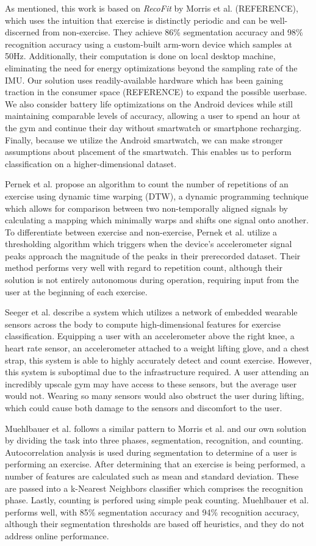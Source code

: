 As mentioned, this work is based on \textit{RecoFit} by Morris et al. (REFERENCE), which uses the intuition that exercise is distinctly periodic and can be well-discerned from non-exercise. They achieve 86\% segmentation accuracy and 98\% recognition accuracy using a custom-built arm-worn device which samples at 50Hz. Additionally, their computation is done on local desktop machine, eliminating the need for energy optimizations beyond the sampling rate of the IMU. Our solution uses readily-available hardware which has been gaining traction in the consumer space (REFERENCE) to expand the possible userbase. We also consider battery life optimizations on the Android devices while still maintaining comparable levels of accuracy, allowing a user to spend an hour at the gym and continue their day without smartwatch or smartphone recharging. Finally, because we utilize the Android smartwatch, we can make stronger assumptions about placement of the smartwatch. This enables us to perform classification on a higher-dimensional dataset.

Pernek et al. propose an algorithm to count the number of repetitions of an exercise using dynamic time warping (DTW), a dynamic programming technique which allows for comparison between two non-temporally aligned signals by calculating a mapping which minimally warps and shifts one signal onto another. To differentiate between exercise and non-exercise, Pernek et al. utilize a thresholding algorithm which triggers when the device's accelerometer signal peaks approach the magnitude of the peaks in their prerecorded dataset. Their method performs very well with regard to repetition count, although their solution is not entirely autonomous during operation, requiring input from the user at the beginning of each exercise.

Seeger et al. describe a system which utilizes a network of embedded wearable sensors across the body to compute high-dimensional features for exercise classification. Equipping a user with an accelerometer above the right knee, a heart rate sensor, an accelerometer attached to a weight lifting glove, and a chest strap, this system is able to highly accurately detect and count exercise. However, this system is suboptimal due to the infrastructure required. A user attending an incredibly upscale gym may have access to these sensors, but the average user would not. Wearing so many sensors would also obstruct the user during lifting, which could cause both damage to the sensors and discomfort to the user. 

Muehlbauer et al. follows a similar pattern to Morris et al. and our own solution by dividing the task into three phases, segmentation, recognition, and counting. Autocorrelation analysis is used during segmentation to determine of a user is performing an exercise. After determining that an exercise is being performed, a number of features are calculated such as mean and standard deviation. These are passed into a k-Nearest Neighbors classifier which comprises the recognition phase. Lastly, counting is perfored using simple peak counting. Muehlbauer et al. performs well, with 85\% segmentation accuracy and 94\% recognition accuracy, although their segmentation thresholds are based off heuristics, and they do not address online performance. 